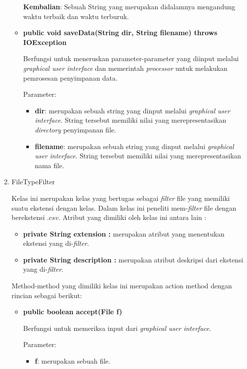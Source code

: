 \begin{enumerate}
\begin{itemize}
		\textbf{Kembalian}: Sebuah String yang merupakan didalamnya mengandung waktu terbaik dan waktu terburuk.
	
	\item \textbf{public void saveData(String dir, String filename) throws IOException}
		
		Berfungsi untuk meneruskan parameter-parameter yang diinput melalui \textit{graphical user interface} dan memerintah \textit{processor} untuk melakukan pemrosesan penyimpanan data.
		
		Parameter:
	\begin{itemize}
		\item \textbf{dir}: merupakan sebuah string yang dinput melalui \textit{graphical user interface}. String tersebut memiliki nilai yang merepresentasikan \textit{directory} penyimpanan file. 
		\item \textbf{filename}: merupakan sebuah string yang dinput melalui \textit{graphical user interface}. String tersebut memiliki nilai yang merepresentasikan nama file.
	\end{itemize}
	\end{itemize}
	
	\item FileTypeFilter
	
	Kelas ini merupakan kelas yang bertugas sebagai \textit{filter} file yang memiliki suatu ekstensi dengan kelas. Dalam kelas ini peneliti mem-\textit{filter} file dengan berekstensi \(.csv\). Atribut yang dimiliki oleh kelas ini antara lain :
	
	\begin{itemize}
			\item \textbf{private String extension :} merupakan atribut yang menentukan ekstensi yang di-\textit{filter}.
			\item \textbf{private String description :} merupakan atribut deskripsi dari ekstensi yang di-\textit{filter}.
		\end{itemize}
		
		Method-method yang dimiliki kelas ini merupakan action method dengan rincian sebagai berikut:
		
		\begin{itemize}
		\item \textbf{public boolean accept(File f)} 
		
		Berfungsi untuk memeriksa input dari \textit{graphical user interface}.
		
		Parameter:
	\begin{itemize}
		\item \textbf{f}: merupakan sebuah file. 
	\end{itemize}
	

\end{itemize}
\end{enumerate}
